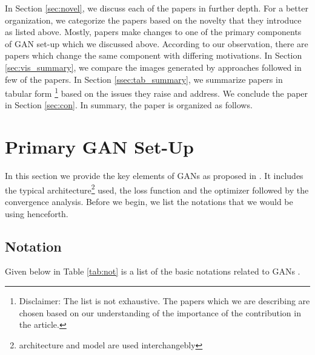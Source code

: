 In Section \ref{sec:novel}, we discuss each of the papers in further depth. For a better organization, we categorize the papers based on the novelty that they introduce as listed above. Mostly, papers make changes to one of the primary components of GAN set-up which we discussed above. According to our observation, there are papers which change the same component with differing motivations. In Section \ref{sec:vis_summary}, we compare the images generated by approaches followed in few of the papers. In Section \ref{ssec:tab_summary}, we summarize papers in tabular form \footnote{Disclaimer: The list is not exhaustive. The papers which we are describing are chosen based on our understanding of
the importance of the contribution in the article.} based on the issues they raise and address. We conclude the paper in Section \ref{sec:con}. In summary, the paper is organized as follows. 

\tableofcontents
 


 


\section{Primary GAN Set-Up}
\label{sec:set_up}
In this section we provide the key elements of GANs as proposed in \citep{ganGoodfellow}. It includes the typical architecture\footnote{architecture and model are used interchangebly} used, the loss function and the optimizer followed by the convergence analysis. Before we begin, we list the notations that we would be using henceforth.
\subsection{Notation}
Given below in Table \ref{tab:not} is a list of the basic notations related to GANs .


